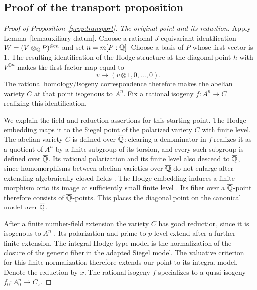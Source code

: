 \subsection{Proof of the transport proposition}

\begin{proof}[Proof of Proposition~\ref{prop:transport}]
\medskip\noindent
\emph{The original point and its reduction.}
Apply Lemma~\ref{lem:auxiliary-datum}.  Choose a rational
$J$-equivariant identification
$W=(V\otimes_\mathbb Q P)^{\oplus m}$ and set $n=m[P:\mathbb Q]$.
Choose a basis of $P$ whose first vector is $1$.  The resulting
identification of the Hodge structure at the diagonal point $h$
with $V^{\oplus n}$ makes the first-factor map equal to
\begin{equation}
 v\longmapsto(v\otimes1,0,\ldots,0).
 \label{eq:transport-first-factor}
\end{equation}
The rational homology/isogeny correspondence
\cite[Corollary~6.9]{MilneShimura} therefore makes the abelian variety
\(C\) at that point isogenous to \(A^n\). Fix a rational isogeny
\(f:A^n\to C\) realizing this identification.

We explain the field and reduction assertions for this starting
point.  The Hodge embedding maps it to the Siegel point of the
polarized variety $C$ with finite level.  The abelian variety $C$
is defined over $\overline{\mathbb Q}$: clearing a denominator in $f$ realizes
it as a quotient of $A^n$ by a finite subgroup of its torsion, and
every such subgroup is defined over $\overline{\mathbb Q}$.  Its rational
polarization and its finite level also descend to $\overline{\mathbb Q}$, since
homomorphisms between abelian varieties over $\overline{\mathbb Q}$ do not
enlarge after extending algebraically closed fields
\cite[Corollary~20.4]{MilneAV}.  The Hodge
embedding induces a finite morphism onto its
image at sufficiently small finite level
\cite[Theorem~5.16]{MilneShimura}. Its fiber over a
$\overline{\mathbb Q}$-point therefore consists of $\overline{\mathbb Q}$-points.  This places
the diagonal point on the canonical model over $\overline{\mathbb Q}$.

After a finite number-field extension the variety $C$ has good
reduction, since it is isogenous to $A^n$
\cite[Chapter~IV, Theorem~3.5]{MilneAVNotes}.  Its polarization and
prime-to-$p$ level extend after a further finite extension.
The integral Hodge-type model is the normalization of the closure
of the generic fiber in the adapted Siegel model.  The valuative
criterion for this finite normalization therefore extends our
point to its integral model.  Denote the reduction by $x$.
The rational isogeny $f$ specializes to a quasi-isogeny
$f_0:A_0^n\to C_x$.


\end{proof}

